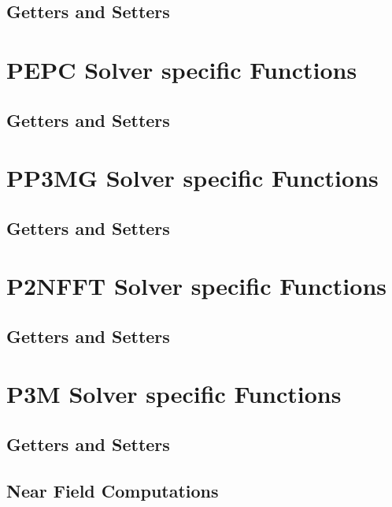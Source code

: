 \FloatBarrier
\subsection{Getters and Setters}

\FloatBarrier
\section{PEPC Solver specific Functions}


\FloatBarrier
\subsection{Getters and Setters}

\FloatBarrier
\section{PP3MG Solver specific Functions}


\FloatBarrier
\subsection{Getters and Setters}

\FloatBarrier
\section{P2NFFT Solver specific Functions}


\FloatBarrier
\subsection{Getters and Setters}

\FloatBarrier
\section{P3M Solver specific Functions}

\FloatBarrier
\subsection{Getters and Setters}

\FloatBarrier
\subsection{Near Field Computations}

